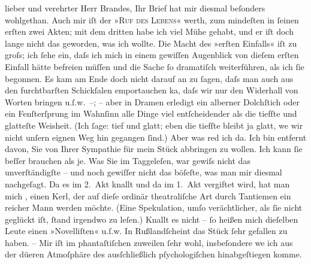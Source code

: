 \pstart{}lieber und verehrter Herr Brandes,\pend\vspace{0.5em}
\pstart
           Ihr Brief hat mir diesmal beſonders wohlgethan. Auch mir iſt der »\textsc{Ruf des Lebens}« werth, zum mindeſten in ſeinen erſten zwei Akten; mit dem dritten habe ich
               viel Mühe gehabt, und er iſt doch lange nicht das geworden, was ich wollte. Die Macht
               des »erſten Einfalls« iſt zu groſs; ich ſehe ein, daſs ich {\pb}mich in einem gewiſſen Augenblick von dieſem
               erſten Einfall hätte befreien \introOben{}müſſen\introOben{} und die Sache ſo
               dramatiſch weiterführen, als ich ſie begonnen. Es kam am Ende doch nicht darauf an zu
               ſagen, daſs man auch aus den furchtbarſten Schickſalen emportauchen ka{\geminationn}, daſs wir nur den Widerhall von Worten bringen
               u.ſ.w. –; – aber in Dramen erledigt ein alberner Dolchſtich {\pb}oder ein Fenſterſprung im Wahnſinn alle Dinge viel
               entſcheidender als die tiefſte und glatteſte Weisheit. (Ich ſage: tief und glatt;
               eben die tiefſte bleibt ja glatt, we{\geminationn} wir nicht unſern
               eignen Weg hin gegangen ſind.) Aber was red ich da. Ich bin entfernt davon, Sie von
               Ihrer Sympathie für mein Stück abbringen zu wollen. Ich kann ſie beſſer brauchen als
               je. Was Sie im Taggeleſen, war {\pb}gewiſs nicht das unverſtändigſte – und noch
               gewiſſer nicht das böſeſte, was man mir diesmal nachgeſagt. Da es im 2. Akt knallt
               und da im 1. Akt vergiftet wird, hat man mich \label{K_L01590-1v}\label{K_L01590-1}, einen Kerl, der auf dieſe ordinär
               theatraliſche Art durch Tantiemen ein reicher Mann werden möchte. (Eine Spekulation,
               umſo verächtlicher, als ſie nicht geglückt iſt, ſtand irgendwo zu {\pb}leſen.) Knallt es nicht – ſo heißen mich dieſelben
               Leute einen »Novelliſten« u.ſ.w. In Rußlandſcheint das Stück ſehr gefallen zu haben. – Mir iſt
               im phantaſtiſchen zuweilen ſehr wohl, insbeſondere we{\geminationn}
               ich aus der dü{\geminationn}eren Atmoſphäre des ausſchließlich
               pſychologiſchen hinabgeſtiegen komme.\pend
           
